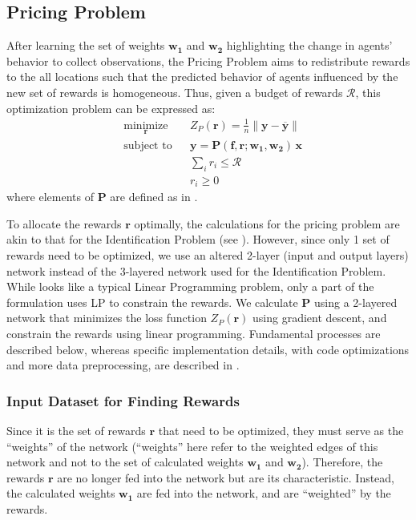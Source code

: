 \documentclass[12pt]{article}
\newcommand{\vect}[1]{\mathbf{#1}}  %
\newcommand{\matr}[1]{\mathbf{#1}}  %
\newcommand{\mean}[1]{\overline{#1}}    %
\begin{document}
    \subsection{Pricing Problem} \label{sec:Pricing Problem}
    After learning the set of weights $\matr{w_1}$ and $\matr{w_2}$ highlighting the change in agents' behavior to collect observations, the Pricing Problem aims to redistribute rewards to the all locations such that the predicted behavior of agents influenced by the new set of rewards is homogeneous. Thus, given a budget of rewards $\mathcal{R}$, this optimization problem can be expressed as:
    \begin{equation} \label{eqn:pricing_problem}
        \begin{aligned}
            & \underset{\vect{r}}{\text{minimize}}
            & & Z_P(\vect{r}) = \frac{1}{n}\lVert \vect{y} - \mean{\vect{y}} \rVert\\
            & \text{subject to}
            & & \vect{y} = \matr{P}(\matr{f}, \vect{r}; \matr{w_1}, \matr{w_2}) \, \vect{x}\\
            &&& \sum_{i} r_i \leq \mathcal{R}\\
            &&& r_i \geq 0
        \end{aligned}
    \end{equation}
    where elements of $\matr{P}$ are defined as in .
    
    To allocate the rewards $\vect{r}$ optimally, the calculations for the pricing problem are akin to that for the Identification Problem (see ). However, since only 1 set of rewards need to be optimized, we use an altered 2-layer (input and output layers) network instead of the 3-layered network used for the Identification Problem. While  looks like a typical Linear Programming problem, only a part of the formulation uses LP to constrain the rewards. We calculate $\matr{P}$ using a 2-layered network that minimizes the loss function $Z_P(\vect{r})$ using gradient descent, and constrain the rewards using linear programming. Fundamental processes are described below, whereas specific implementation details, with code optimizations and more data preprocessing, are described in .
    
    \subsubsection{Input Dataset for Finding Rewards}
    Since it is the set of rewards $\vect{r}$ that need to be optimized, they must serve as the ``weights'' of the network (``weights'' here refer to the weighted edges of this network and not to the set of calculated weights $\matr{w_1}$ and $\matr{w_2}$). Therefore, the rewards $\vect{r}$ are no longer fed into the network but are its characteristic. Instead, the calculated weights $\matr{w_1}$ are fed into the network, and are ``weighted'' by the rewards.
    
\end{document}
